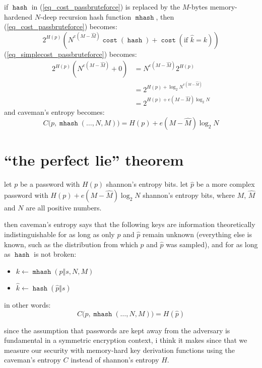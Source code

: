 \documentclass[twocolumn]{article}
\DeclareMathOperator{\hash}{\mathtt{hash}}
\DeclareMathOperator{\mhash}{\mathtt{mhash}}
\DeclareMathOperator{\cost}{\mathtt{cost}}
\begin{document}
if $\hash$ in (\ref{eq_cost_passbruteforce}) is replaced by the $M$-bytes
memory-hardened $N$-deep recursion hash function $\mhash$, then
(\ref{eq_cost_passbruteforce}) becomes:
\begin{equation}\label{eq_cost_passbruteforce_NM}
    2^{H(p)} \left(
        N^{e(M-\hat M)}\cost(\hash) + \cost(\text{if } \hat k = k)
    \right)
\end{equation}
(\ref{eq_simplecost_passbruteforce}) becomes:
\begin{equation}\label{eq_simplecost_passbruteforce_NM}
    \begin{split}
    2^{H(p)} (N^{e(M-\hat M)}+0) &= N^{e(M-\hat M)} 2^{H(p)} \\
                  &= 2^{H(p) + \log_2 N^{e(M-\hat M)}} \\
                  &= 2^{H(p) + e(M-\hat M)\log_2 N}
    \end{split}
\end{equation}
and caveman's entropy becomes:
\begin{equation}
    C\Big(p, \mhash(\ldots, N, M)\Big) = H(p) + e(M-\hat M)\log_2 N
\end{equation}

\section{``the perfect lie'' theorem}
let $p$ be a password with $H(p)$ shannon's entropy bits.  let $\hat p$ be
a more complex password with $H(p) + e(M-\hat M)\log_2 N$ shannon's entropy
bits, where $M$, $\hat M$ and $N$ are all positive numbers.

then caveman's entropy says that the following keys are information
theoretically indistinguishable for as long as only $p$ and $\hat p$ remain
unknown (everything else is known, such as the distribution from which $p$
and $\hat p$ was sampled), and for as long as $\hash$ is not broken:
\begin{itemize}
    \item $k \gets \mhash(p \Vert s, N, M)$
    \item $\hat k \gets \hash(\hat p \Vert s)$
\end{itemize}

in other words:
\begin{equation}
    C\Big(p, \mhash(\ldots, N, M)\Big) = H(\hat p)
\end{equation}

since the assumption that passwords are kept away from the adversary is
fundamental in a symmetric encryption context, i think it makes since that
we measure our security with memory-hard key derivation functions using the
caveman's entropy $C$ instead of shannon's entropy $H$.
\end{document}
